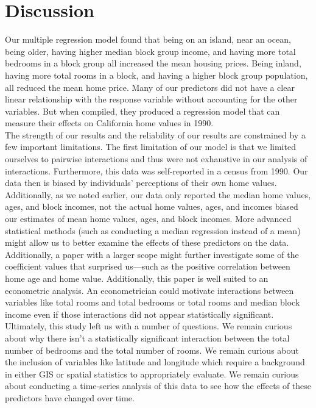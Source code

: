 \documentclass{article}
\begin{document}
\section*{Discussion}

Our multiple regression model found that being on an island, near an ocean, being older, having higher median block group income, and having more total bedrooms in a block group all increased the mean housing prices. Being inland, having more total rooms in a block, and having a higher block group population, all reduced the mean home price. Many of our predictors did not have a clear linear relationship with the response variable without accounting for the other variables. But when compiled, they produced a regression model that can measure their effects on California home values in 1990. \\

The strength of our results and the reliability of our results are constrained by a few important limitations. The first limitation of our model is that we limited ourselves to pairwise interactions and thus were not exhaustive in our analysis of interactions. Furthermore, this data was self-reported in a census from 1990. Our data then is biased by individuals' perceptions of their own home values. Additionally, as we noted earlier, our data only reported the median home values, ages, and block incomes, not the actual home values, ages, and incomes biased our estimates of mean home values, ages, and block incomes. More advanced statistical methods (such as conducting a median regression instead of a mean) might allow us to better examine the effects of these predictors on the data. Additionally, a paper with a larger scope might further investigate some of the coefficient values that surprised us—such as the positive correlation between home age and home value. Additionally, this paper is well suited to an econometric analysis. An econometrician could motivate interactions between variables like total rooms and total bedrooms or total rooms and median block income even if those interactions did not appear statistically significant. \\

Ultimately, this study left us with a number of questions. We remain curious about why there isn't a statistically significant interaction between the total number of bedrooms and the total number of rooms. We remain curious about the inclusion of variables like latitude and longitude which require a background in either GIS or spatial statistics to appropriately evaluate. We remain curious about conducting a time-series analysis of this data to see how the effects of these predictors have changed over time. \\
\end{document}

